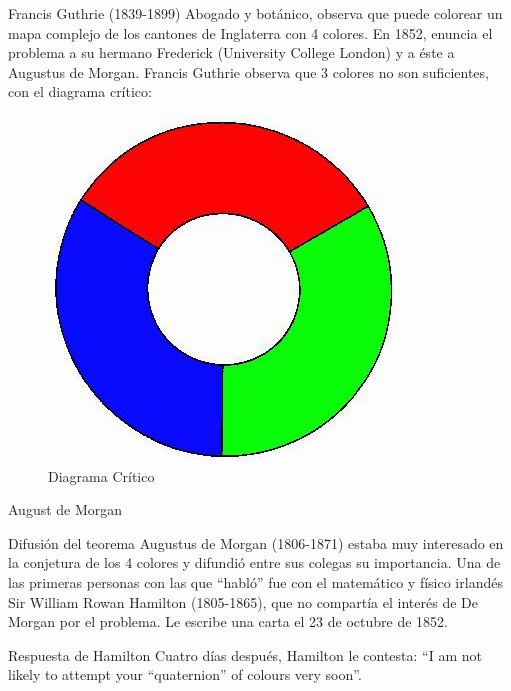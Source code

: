 \documentclass[spanish,utf8]{beamer}
\begin{document}
\begin{frame}{\insertsection}
\begin{flushright}
\begin{block}{Francis Guthrie (1839-1899)}
Abogado y botánico, observa que puede colorear un mapa complejo de los cantones de Inglaterra con 4 colores. En 1852, enuncia el problema a su hermano Frederick (University College London) y a éste a Augustus de Morgan. Francis Guthrie observa que 3 colores no son suficientes, con el diagrama crítico:
\end{block}
\begin{figure}
  \includegraphics[scale=0.3]{diagrama.jpg}
    \caption{Diagrama Crítico}
\end{figure}
\end{flushright}
\end{frame}
\begin{frame}{\insertsection}
August de Morgan
\begin{block}{Difusión del teorema}
Augustus de Morgan (1806-1871) estaba muy interesado en la conjetura de los 4 colores y difundió entre sus colegas su importancia. Una de las primeras personas con las que ``habló'' fue con el matemático y físico irlandés Sir William Rowan Hamilton (1805-1865), que no compartía el interés de De Morgan por el problema. Le escribe una carta el 23 de octubre de 1852.
\end{block}

\begin{block}{Respuesta de Hamilton}
Cuatro días después, Hamilton le contesta: ``I am not likely to attempt your “quaternion” of colours very soon''.
\end{block}    
\end{frame}
\end{document}
